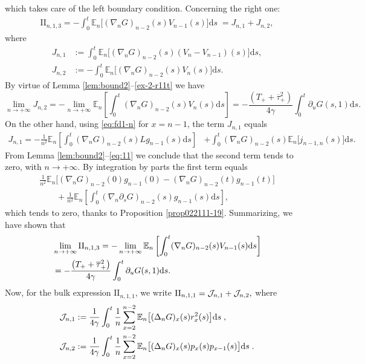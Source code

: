 \documentclass[EJP]{ejpecp} %
\newcommand \ga{\gamma}
\newcommand{\dd  }{\mathrm{d}}
\renewcommand{\bar}{\overline}
\numberwithin{equation}{section}
\begin{document}
which takes care of the left boundary condition. Concerning the right
one:
\begin{align}
  \label{eq:6aa} 
\mathrm{II}_{n,1,3} =-  \int_0^t   {\mathbb E}_n\big[ (\nabla_n G)_{n-2} (s)
     V_{n-1}(s)\big]  \dd s\;  =J_{n,1}+J_{n,2} ,
\end{align}
where 
\begin{align*}
J_{n,1}&:= \int_0^t  {\mathbb E}_n\big[   (\nabla_n G)_{n-2} (s) (V_n-V_{n-1})(s)
 \big] \dd s, \\
J_{n,2}&:= -\int_0^t {\mathbb E}_n\big[  (\nabla_n G)_{n-2} (s)
     V_{n}(s) \big] \dd s.
  \end{align*}
By virtue of Lemma \ref{lem:bound2}--\eqref{ex-2-r11t} we have
\[
\lim_{n\to+\infty}  J_{n,2}= - \lim_{n\to+\infty}  {\mathbb E}_n\left[ \int_0^t  (\nabla_n G)_{n-2} (s)
     V_{n}(s)\dd s \right]
 = -\frac{\left(T_+
     + \bar\tau_+^2\right)}{4\ga} \int_0^t  \partial_u G(s,1) \dd s.
\]
On the other hand, using \eqref{eq:fd1-n} for $x=n-1$, the term $J_{n,1}$
equals
\begin{equation}
  \label{eq:6b}
  \begin{split}  
 J_{n,1}=  -\frac{1}{n^2} {\mathbb E}_n\left[ \int_0^t   (\nabla_n
     G)_{n-2} (s) L g_{n-1}(s) \dd s
 \right]
&+ \int_0^t  (\nabla_n G)_{n-2} (s)
  {\mathbb E}_n  \big[j_{n-1,n}(s)\big] \dd s.
  \end{split}
\end{equation}
From Lemma \ref{lem:bound2}--\eqref{eq:11} we conclude that the second term {tends to zero}, with
$n\to+\infty$. By integration by parts the first term equals
\begin{multline}
  \label{eq:6c}
  \frac{1}{n^2} {\mathbb E}_n\Big[(\nabla_n
  G)_{n-2} (0) g_{n-1}(0)- (\nabla_n
  G)_{n-2} (t) g_{n-1}(t) 
 \Big]  \\  \qquad  +\frac{1}{n^2} {\mathbb E}_n\left[ \int_0^t  (\nabla_n
     \partial_s G)_{n-2} (s) g_{n-1}(s)  \dd s
 \right],
\end{multline}
which {tends to zero}, thanks to Proposition \ref{prop022111-19}. Summarizing, we have shown that
\begin{align}
  \label{eq:6d} 
&  \lim_{n\to+\infty} \mathrm{II}_{n,1,3}   =-\lim_{n\to+\infty} {\mathbb E}_n\left[ \int_0^t (\nabla_n G)_{n-2} (s)
     V_{n-1}(s)   \dd s \right] \notag\\
     &  =
 - \frac{\left(T_+
     + \bar\tau_+^2\right) }{4\ga}\int_0^t  \partial_u G(s,1) \dd s .
  \end{align}
Now, for the bulk expression $\mathrm{II}_{n,1,1}$, we  write
$
\mathrm{II}_{n,1,1} = {\cal J}_{n,1}+{\cal J}_{n,2},
$
where
\begin{align*}
{\cal J}_{n,1}&:=\frac{1}{4\ga}\int_0^{t}  \frac 1{n}  \sum_{x=2}^{n-2} {\mathbb E}_n\big[
                                                  (\Delta_n G)_x (s)r_x^2(s)
                                                 \big] \dd s\;, \\
{\cal J}_{n,2}&:=\frac{1}{4\ga}\int_0^{t}   \frac 1{n}  \sum_{x=2}^{n-2}{\mathbb E}_n\big[
                                                  (\Delta_n G)_x (s)p_x(s)p_{x-1}(s)
                                                 \big] \dd s\;.
\end{align*}
\end{document}
